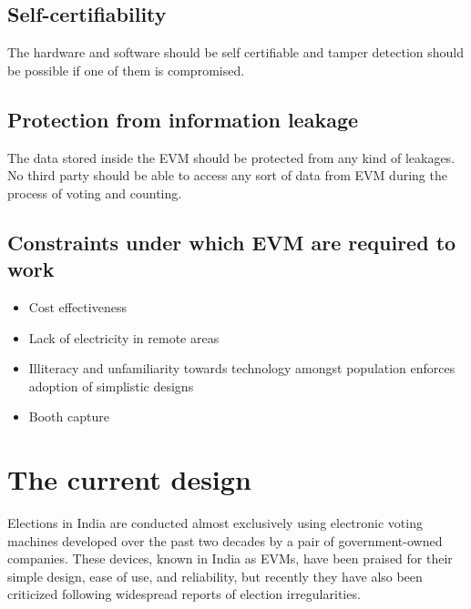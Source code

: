 \documentclass[a4paper,12pt,openany]{book}
\begin{document}
\section{Self-certifiability}
The hardware and software should be self certifiable and tamper detection should be possible if one of them is compromised.

\section{Protection from information leakage}
The data stored inside the EVM should be protected from any kind of leakages. No third party should be able to access any sort of data from EVM during the process of voting and counting.

\section{Constraints under which EVM are required to work}

\begin{itemize}
\item Cost effectiveness
\item Lack of electricity in remote areas
\item Illiteracy and unfamiliarity towards technology amongst population enforces adoption of simplistic designs
\item Booth capture
\end{itemize}

\chapter{The current design}
Elections in India are conducted almost exclusively using electronic voting machines developed over
the past two decades by a pair of government-owned companies. These devices, known in India as EVMs,
have been praised for their simple design, ease of use, and reliability, but recently they have also been
criticized following widespread reports of election irregularities.
\end{document}
